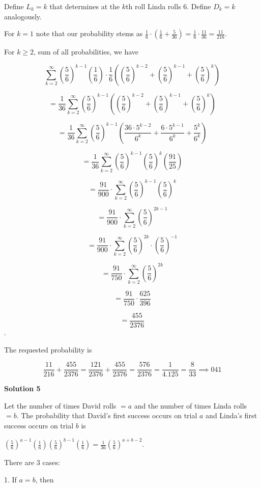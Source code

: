 \begin{enumerate}
Define $L_k = k$ that determines at the $k$th roll Linda rolls 6. Define $D_k=k$ analogously.

 For $k=1$ note that our probability stems as $\frac{1}{6} \cdot (\frac{1}{6} + \frac{5}{36}) = \frac{1}{6} \cdot \frac{11}{36} = \frac{11}{216}$.

 For $k \ge 2$, sum of all probabilities, we have

 
 \[\sum_{k=2}^\infty (\frac{5}{6})^{k-1}(\frac{1}{6}) \cdot \frac{1}{6}((\frac{5}{6})^{k-2} + (\frac{5}{6})^{k-1} + (\frac{5}{6})^{k})\]

 \[=\frac{1}{36}\sum_{k=2}^\infty (\frac{5}{6})^{k-1}((\frac{5}{6})^{k-2} + (\frac{5}{6})^{k-1} + (\frac{5}{6})^{k})\]

 \[=\frac{1}{36}\sum_{k=2}^\infty (\frac{5}{6})^{k-1}(\frac{36 \cdot 5^{k-2}}{6^{k}} + \frac{6 \cdot 5^{k-1}}{6^{k}} + \frac{5^{k}}{6^{k}})\]

 \[=\frac{1}{36}\sum_{k=2}^\infty (\frac{5}{6})^{k-1}(\frac{5}{6})^{k}(\frac{91}{25})\]

 \[=\frac{91}{900} \cdot \sum_{k=2}^\infty (\frac{5}{6})^{k-1}(\frac{5}{6})^{k}\]

 \[= \frac{91}{900} \cdot \sum_{k=2}^\infty (\frac{5}{6})^{2k-1}\]

 \[=\frac{91}{900} \cdot \sum_{k=2}^\infty (\frac{5}{6})^{2k} \cdot (\frac{5}{6})^{-1}\]

 \[=\frac{91}{750} \cdot \sum_{k=2}^\infty (\frac{5}{6})^{2k}\]

 \[=\frac{91}{750} \cdot \frac{625}{396}\]

 \[=\frac{455}{2376}\].

 The requested probability is

 
 \[\frac{11}{216} + \frac{455}{2376} = \frac{121}{2376} + \frac{455}{2376} = \frac{576}{2376} = \frac{1}{4.125} = \frac{8}{33} \implies \boxed{041}\]




\textbf{Solution 5}

Let the number of times David rolls $=a$ and the number of times Linda rolls $=b$. The probability that David's first success occurs on trial $a$ and Linda's first success occurs on trial $b$ is

 $\left(\frac{5}{6}\right)^{a-1}\left(\frac{1}{6}\right)\left(\frac{5}{6}\right)^{b-1}\left(\frac{1}{6}\right) = \frac{1}{36}\left(\frac{5}{6}\right)^{a+b-2}.$

 There are 3 cases:

 1. If $a=b$, then


\end{enumerate}
